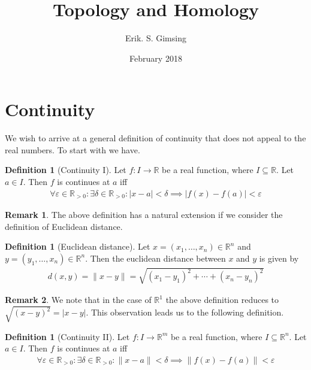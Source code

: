 \documentclass{article}
\title{Topology and Homology}
\author{Erik. S. Gimsing}
\date{February 2018}
\theoremstyle{plain}
\theoremstyle{definition}
\newtheorem*{remark}{Remark}
\newtheorem{definition}[theorem]{Definition}
\newcommand{\R}{\mathbb{R}}
\begin{document}
\maketitle
\section{Continuity}
We wish to arrive at a general definition of continuity that does not
appeal to the real numbers. To start with we have.
\begin{definition}[Continuity I]
	Let $f:I\rightarrow\R$ be a real function, where $I\subseteq\R$. Let
	$a\in I$. Then $f$ is continues at $a$ iff
	\begin{equation}
	\begin{aligned}
		\forall\varepsilon\in\R_{>0}:\exists\delta\in\R_{>0}:|x-a|<\delta
		\implies|f(x)-f(a)|<\varepsilon
	\end{aligned}
	\end{equation}
\end{definition}
\begin{remark}
The above definition has a natural extension if we consider the definition of
Euclidean distance.
\end{remark}
\begin{definition}[Euclidean distance]
	Let $x=(x_1,\dots,x_n)\in\R^n$ and \newline
	$y=(y_1,\dots,x_n)\in\R^n$. Then the euclidean distance between
	$x$ and $y$ is given by
	\begin{equation}
	\begin{aligned}
		d(x,y)=\|x-y\|=\sqrt{{(x_1-y_1)}^2+\cdots+{(x_n-y_n)}^2}
	\end{aligned}
	\end{equation}
\end{definition}
\begin{remark}
	We note that in the case of $\R^1$ the above definition reduces to
	$\sqrt{{(x-y)}^2}=|x-y|$. This observation leads us to the following
	definition.
\end{remark}
\begin{definition}[Continuity II]
	Let $f:I\rightarrow\R^m$ be a real function, where $I\subseteq\R^n$. Let
	$a\in I$. Then $f$ is continues at $a$ iff
	\begin{equation}
	\begin{aligned}
		\forall\varepsilon\in\R_{>0}:\exists\delta\in\R_{>0}:\|x-a\|<\delta
		\implies\|f(x)-f(a)\|<\varepsilon
	\end{aligned}
	\end{equation}
\end{definition}
\end{document}
